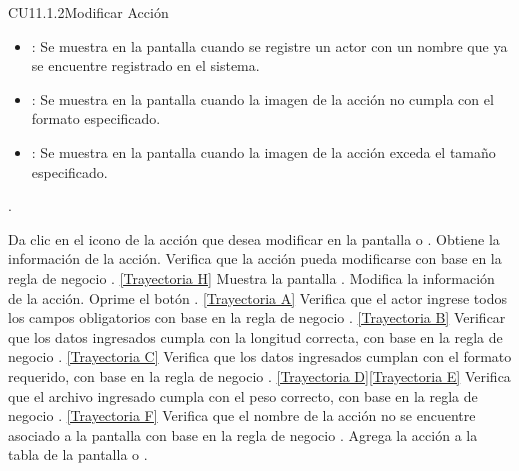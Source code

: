 \begin{UseCase}{CU11.1.2}{Modificar Acción}
{\begin{itemize}
			\item {}: Se muestra en la pantalla  cuando se registre un actor con un nombre que ya se encuentre registrado en el sistema.
			\item {}: Se muestra en la pantalla  cuando la imagen de la acción no cumpla con el formato especificado.
			\item {}: Se muestra en la pantalla  cuando la imagen de la acción exceda el tamaño especificado.
		\end{itemize}.
	}
\end{UseCase}
\begin{UCtrayectoria}
	\UCpaso[\UCactor] Da clic en el icono \editar de la acción que desea modificar en la pantalla  o .
	\UCpaso[\UCsist] Obtiene la información de la acción.
	\UCpaso[\UCsist] Verifica que la acción pueda modificarse con base en la regla de negocio . \hyperlink{CU11-1-2:TAH}{[Trayectoria H]}
	\UCpaso[\UCsist] Muestra la pantalla .
	\UCpaso[\UCactor] Modifica la información de la acción. \label{CU11.1.2-P4}
	\UCpaso[\UCactor] Oprime el botón . \hyperlink{CU11-1-2:TAA}{[Trayectoria A]} 
	\UCpaso[\UCsist] Verifica que el actor ingrese todos los campos obligatorios con base en la regla de negocio . \hyperlink{CU11-1-2:TAB}{[Trayectoria B]}
	\UCpaso[\UCsist] Verificar que los datos ingresados cumpla con la longitud correcta, con base en la regla de negocio . \hyperlink{CU11-1-2:TAC}{[Trayectoria C]}
	\UCpaso[\UCsist] Verifica que los datos ingresados cumplan con el formato requerido, con base en la regla de negocio . \hyperlink{CU11-1-2:TAD}{[Trayectoria D]}\hyperlink{CU11-1-2:TAE}{[Trayectoria E]}
	\UCpaso[\UCsist] Verifica que el archivo ingresado cumpla con el peso correcto, con base en la regla de negocio . \hyperlink{CU11-1-2:TAF}{[Trayectoria F]}
	\UCpaso[\UCsist] Verifica que el nombre de la acción no se encuentre asociado a la pantalla con base en la regla de negocio .  
	\UCpaso[\UCsist] Agrega la acción a la tabla de la pantalla  o .
\end{UCtrayectoria}		
